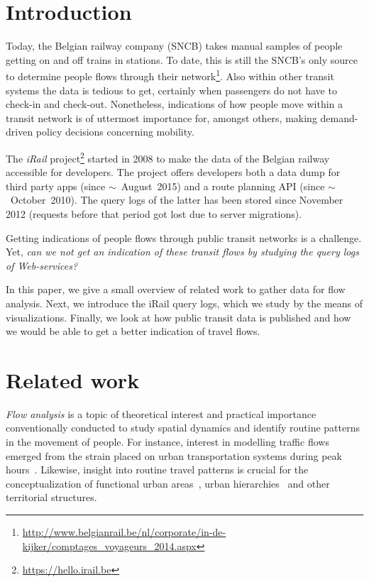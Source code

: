 \documentclass{sig-alternate}
\begin{document}
\vspace{1em}

\section{Introduction}
\label{sec:introduction}

Today, the Belgian railway company (SNCB) takes manual samples of people getting on and off trains in stations. 
To date, this is still the SNCB's only source to determine people flows through their network\footnote{\url{http://www.belgianrail.be/nl/corporate/in-de-kijker/comptages_voyageurs_2014.aspx}}.
Also within other transit systems the data is tedious to get, certainly when passengers do not have to check-in and check-out.
Nonetheless, indications of how people move within a transit network is of uttermost importance for, amongst others, making demand-driven policy decisions concerning mobility.

The \emph{iRail} project\footnote{\url{https://hello.irail.be}} started in 2008 to make the data of the Belgian railway accessible for developers.
The project offers developers both a data dump for third party apps (since $\sim$~August~2015) and a route planning API (since $\sim$~October~2010).
The query logs of the latter has been stored since November 2012 (requests before that period got lost due to server migrations).

Getting indications of people flows through public transit networks is a challenge. 
Yet, \emph{can we not get an indication of these transit flows by studying the query logs of Web-services?}

In this paper, we give a small overview of related work to gather data for flow analysis.
Next, we introduce the iRail query logs, which we study by the means of visualizations.
Finally, we look at how public transit data is published and how we would be able to get a better indication of travel flows.

\section{Related work}
\label{sec:relwork}

\emph{Flow analysis} is a topic of theoretical interest and practical importance conventionally conducted to study spatial dynamics and identify routine patterns in the movement of people.
For instance, interest in modelling traffic flows emerged from the strain placed on urban transportation systems during peak hours~\cite{roth,ferreira}.
Likewise, insight into routine travel patterns is crucial for the conceptualization of functional urban areas~\cite{servillo2013town}, urban hierarchies~\cite{christaller1966central} and other territorial structures.
\end{document}
